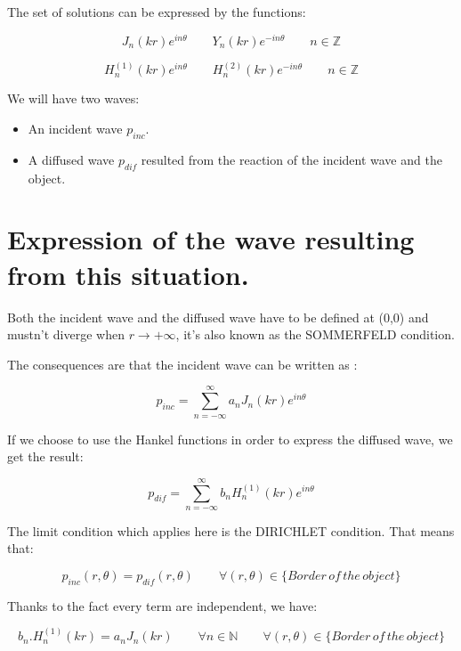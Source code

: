 The set of solutions can be expressed by the functions:

\begin{equation}
J_{n}(kr)e^{in\theta} \qquad Y_{n}(kr)e^{-in\theta}  \qquad    n\in \mathbb{Z}
\end{equation}

\begin{equation}
H^{(1)}_{n}(kr)e^{in\theta} \qquad H^{(2)}_{n}(kr)e^{-in\theta}  \qquad    n\in \mathbb{Z}
\end{equation}

We will have two waves:
\begin{itemize}
\item An incident wave $p_{inc}$.
\item A diffused wave $p_{dif}$ resulted from the reaction of the incident wave and the object.
\end{itemize}

\chapter{Expression of the wave resulting from this situation.}

Both the incident wave and the diffused wave have to be defined at (0,0) and mustn't diverge when $r\rightarrow +\infty$, it's also known as the SOMMERFELD condition.

The consequences are that the incident wave can be written as :

\begin{equation}
p_{inc} =  	\sum_{n=-\infty}^{\infty} a_n J_{n}(kr)e^{in\theta} 
\end{equation}

If we choose to use the Hankel functions in order to express the diffused wave, we get the result:

\begin{equation}
p_{dif} =  	\sum_{n=-\infty}^{\infty} b_{n}H^{(1)}_{n}(kr)e^{in\theta}
\end{equation}

The limit condition which applies here is the DIRICHLET condition. That means that:

\begin{equation}
p_{inc}(r,\theta) = p_{dif}(r,\theta) \qquad \forall(r,\theta) \in \{Border\, of\, the\, object\}
\end{equation}

Thanks to the fact every term are independent, we have:

\begin{equation}
b_{n}.H^{(1)}_{n}(kr) = a_n J_{n}(kr) \qquad \forall n \in \mathbb{N} \qquad \forall(r,\theta) \in \{Border\, of\, the\, object\}
\end{equation}

